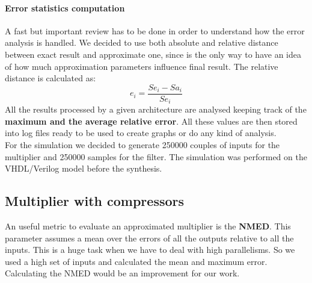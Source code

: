 \documentclass[a4paper]{article}
\begin{document}
	\paragraph{Error statistics computation} A fast but important review has to be done in order to understand how the error analysis is handled.
	We decided to use both absolute and relative distance between exact result and approximate one, since is the only way to have an idea of how much approximation parameters influence final result. The relative distance is calculated as:
	\begin{equation}
		e_{i}=\frac{Se_{i}-Sa_{i}}{Se_{i}}
	\end{equation}
	All the results processed by a given architecture are analysed keeping track of the \textbf{maximum and the average relative error}. All these values are then stored into log files ready to be used to create graphs or do any kind of analysis.\\
	For the simulation we decided to generate 250000 couples of inputs for the multiplier and 250000 samples for the filter. The simulation was performed on the VHDL/Verilog model before the synthesis. 

	\subsection{Multiplier with compressors}

	An useful metric to evaluate an approximated multiplier is the \textbf{NMED}. This parameter assumes a mean over the errors of all the outputs relative to all the inputs. This is a huge task when we have to deal with high parallelisms. So we used a high set of inputs and calculated the mean and maximum error. Calculating the NMED would be an improvement for our work.
\end{document}
